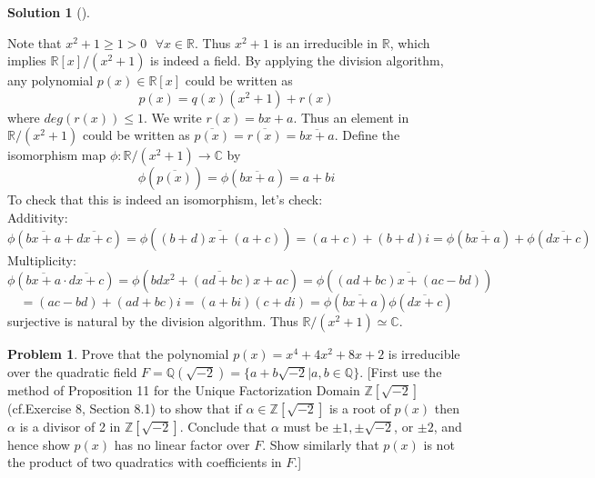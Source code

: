 \documentclass{article}
\newcommand{\sfa}{\text{  } \forall}
\theoremstyle{definition}
\newtheorem{prob}{Problem}
\newtheorem*{sol}{Solution}
\newenvironment{sols}[1][]{%
  \begin{sol}[#1]$ $\par\nobreak\ignorespaces
}{%
  \end{sol}
}
\begin{document}
\begin{sols}
	Note that $x^2 + 1 \geq 1 > 0 \sfa x \in \mathbb{R}$. 
	Thus $x^2 + 1$ is an irreducible in $\mathbb{R}$, which implies $\mathbb{R}[x]/(x^2 + 1)$ is indeed a field. 
	By applying the division algorithm, any polynomial $p(x) \in \mathbb{R}[x]$ could be written as
	\[
		p(x) = q(x) (x^2 + 1) + r(x)
	\]
	where $deg(r(x)) \leq 1$. 
	We write $r(x) = bx + a$. 
	Thus an element in $\mathbb{R}/(x^2 + 1)$ could be written as $\overline{p(x)} = \overline{r(x)} = \overline{bx + a}$.
	Define the isomorphism map $\phi: \mathbb{R}/(x^2 + 1) \to \mathbb{C}$ by 
	\[
		\phi(\overline{p(x)}) = \phi(\overline{bx + a}) = a + bi
	\]
	To check that this is indeed an isomorphism, let's check:\\
	Additivity:
	\[
		\phi(\overline{bx + a} + \overline{dx + c}) = \phi(\overline{(b + d) x + (a + c)}) = (a + c) + (b + d)i = \phi(\overline{bx + a}) + \phi(\overline{dx + c})
	\]
	Multiplicity:
	\[
		\phi(\overline{bx + a} \cdot \overline{dx + c}) = \phi(\overline{bdx^2 + (ad + bc) x + ac}) = \phi(\overline{(ad + bc) x + (ac - bd)}) 
	\]
	\[
		= (ac - bd) + (ad + bc)i = (a + bi)(c + di) = \phi(\overline{bx + a}) \phi(\overline{dx + c})
	\]
	surjective is natural by the division algorithm. 
	Thus $\mathbb{R}/(x^2 + 1) \simeq \mathbb{C}$.
\end{sols}

\setcounter{prob}{9}
\begin{prob}
	Prove that the polynomial $p(x) = x^4 +  4x^2 + 8x + 2$ is irreducible over the quadratic field $F = \mathbb{Q}(\sqrt{-2}) = \{a + b \sqrt{-2} | a, b \in \mathbb{Q} \}$. 
	[First use the method of Proposition 11 for the Unique Factorization Domain $\mathbb{Z}[\sqrt{-2}]$ (cf.Exercise 8, Section 8.1) to show that if $\alpha \in \mathbb{Z}[\sqrt{-2}]$ is a root of $p(x)$ then $\alpha$ is a divisor of 2 in $\mathbb{Z}[\sqrt{-2}]$. 
	Conclude that $\alpha$ must be $\pm 1, \pm \sqrt{-2}$, or $\pm 2$, and hence show $p(x)$ has no linear factor over $F$. 
	Show similarly that $p(x)$ is not the product of two quadratics with coefficients in $F$.]
\end{prob}
\end{document}
